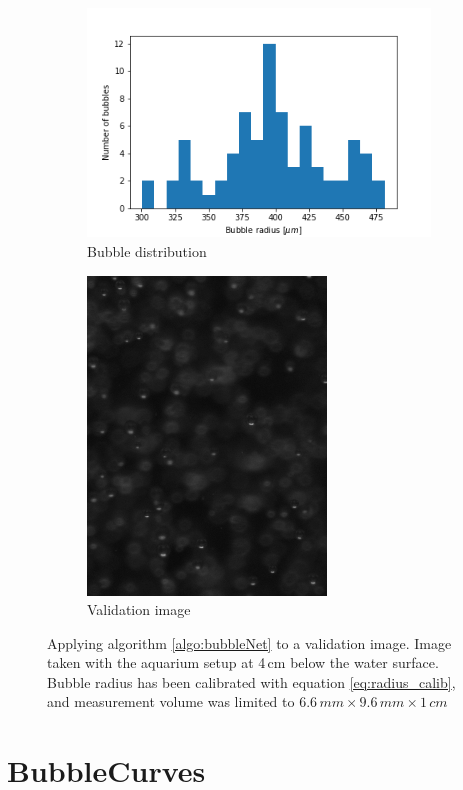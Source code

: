 				\begin{figure}
					\begin{subfigure}[t]{.4\textwidth}
						\includegraphics[scale=0.6]{graphs/b_val_0.png}
						\caption{Bubble distribution}
						\label{subfig:b_val_0}
					\end{subfigure}\hfill
					\begin{subfigure}[t]{.4\textwidth}
						\includegraphics[scale=0.6]{images/val_0.png}
						\caption{Validation image}
						\label{subfig:val_0}
					\end{subfigure}
					\caption{Applying algorithm \ref{algo:bubbleNet} to a validation image. Image taken with the aquarium setup at 4\,cm below the water surface. Bubble radius has been calibrated with equation \ref{eq:radius_calib}, and measurement volume was limited to $6.6\, mm \times 9.6 \, mm \times 1\, cm$}
					\label{bubb_dist_1}
				\end{figure}




			\section{BubbleCurves}\label{result_curves}

